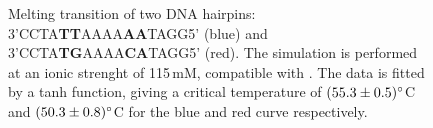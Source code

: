 \begin{figure}[htb]
       \begin{center}
               \scalebox{0.9}{
                        \nonstopmode
                        
                        \errorstopmode
                        \rule[-0.5cm]{0cm}{0cm}}
                \caption{Melting transition of two DNA hairpins: 3'CCTA\textbf{TT}AAAA\textbf{AA}TAGG5' (blue) and 3'CCTA\textbf{TG}AAAA\textbf{CA}TAGG5' (red). The simulation is performed at an ionic strenght of 115\,mM, compatible with \cite{vallone1999melting}. The data is fitted by a tanh function, giving a critical temperature of $(55.3 \pm 0.5)^{\circ}$C and $(50.3 \pm 0.8)^{\circ}$C for the blue and red curve respectively.}
                \label{meltingTemperature}
        \end{center}
\end{figure}

